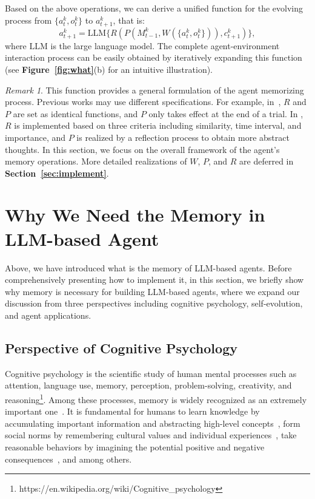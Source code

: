 \documentclass{article}
\theoremstyle{definition}
\theoremstyle{theorem}
\theoremstyle{proof}
\theoremstyle{remark}
\newtheorem*{remark}{Remark}
\begin{document}
	Based on the above operations, we can derive a unified function for the evolving process from $\{a^k_t, o^k_t\}$ to $a^k_{t+1}$, that is:
	$$a^k_{t+1} = \text{LLM}\{R(P(M_{t-1}^k, W(\{a^k_t, o^k_t\})), c_{t+1}^k)\},$$
	where $\text{LLM}$ is the large language model.
	The complete agent-environment interaction process can be easily obtained by iteratively expanding this function (see \textbf{Figure~\ref{fig:what}}(b) for an intuitive illustration). 
	
	\begin{remark}
		This function provides a general formulation of the agent memorizing process.
		Previous works may use different specifications. 
		For example, in~\cite {reflexion}, $R$ and $P$ are set as identical functions, and $P$ only takes effect at the end of a trial.
		In \citet{generative_agents}, $R$ is implemented based on three criteria including similarity, time interval, and importance, and $P$ is realized by a reflection process to obtain more abstract thoughts.
		In this section, we focus on the overall framework of the agent's memory operations. More detailed realizations of $W$, $P$, and $R$ are deferred in \textbf{Section~\ref{sec:implement}}.
	\end{remark}
	
	
	\section{Why We Need the Memory in LLM-based Agent}
	\label{sec:necessity}
	Above, we have introduced what is the memory of LLM-based agents.
	Before comprehensively presenting how to implement it, in this section, we briefly show why memory is necessary for building LLM-based agents, where we expand our discussion from three perspectives including cognitive psychology, self-evolution, and agent applications.
	
	\subsection{Perspective of Cognitive Psychology}
	Cognitive psychology is the scientific study of human mental processes such as attention, language use, memory, perception, problem-solving, creativity, and reasoning\footnote{https://en.wikipedia.org/wiki/Cognitive\_psychology}.
	Among these processes, memory is widely recognized as an extremely important one~\cite{solso1979cognitive}. 
	It is fundamental for humans to learn knowledge by accumulating important information and abstracting high-level concepts~\cite{craik1972levels}, form social norms by remembering cultural values and individual experiences~\cite{leydesdorff2017memory}, take reasonable behaviors by imagining the potential positive and negative consequences~\cite{johnson1983mental}, and among others. 
	
\end{document}
